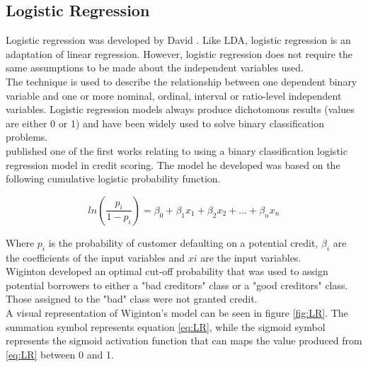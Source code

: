 \subsection{Logistic Regression}

Logistic regression was developed by David \textcite{LogReg}. Like LDA, logistic regression is an adaptation of linear regression. However, logistic regression does not require the same assumptions to be made about the independent variables used. \\

The technique is used to describe the relationship between one dependent binary variable and one or more nominal, ordinal, interval or ratio-level independent variables. Logistic regression models always produce dichotomous results (values are either 0 or 1) and have been widely used to solve binary classification problems. \\

\textcite{LogRegWiginton} published one of the first works relating to using a binary classification logistic regression model in credit scoring. The model he developed was based on the following cumulative logistic probability function.

\vspace{10pt}

\begin{equation} \label{eq:LR}
ln\left(\frac{p_{i}}{1-p_{i}}\right) = \beta_{0} + \beta_{1}x_{1} + \beta_{2}x_{2}+ ... +  \beta_{n}x_{n}
\end{equation}

\vspace{10pt}

Where $p_{i}$ is the probability of customer defaulting on a potential credit, $\beta_{i}$ are the coefficients of the input variables and $x{i}$ are the input variables. \\

Wiginton developed an optimal cut-off probability that was used to assign potential borrowers to either a "bad creditors" class or a "good creditors" class. Those assigned to the "bad" class were not granted credit.  \\

A visual representation of Wiginton's model can be seen in figure \ref{fig:LR}. The summation symbol represents equation \ref{eq:LR}, while the sigmoid symbol represents the sigmoid activation function that can maps the value produced from \ref{eq:LR} between 0 and 1.

\vspace{10pt}


